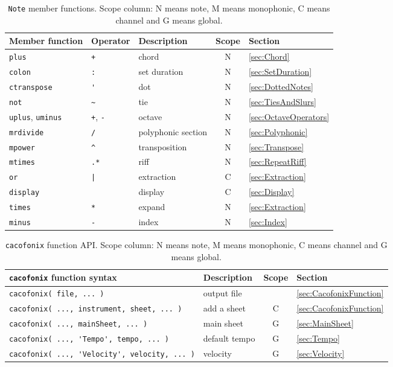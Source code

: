 \documentclass{article}
\begin{document}
\begin{table}[p]
	\centering
	\begin{tabular}{lllcl}
		Member function & Operator & Description & Scope & Section \\
		\hline
		\lstinline!plus! & \lstinline!+! & chord & N & \ref{sec:Chord} \\
		\lstinline!colon! & \lstinline!:! & set duration & N & \ref{sec:SetDuration} \\
		\lstinline!ctranspose! & \lstinline!'! & dot & N & \ref{sec:DottedNotes} \\
		\lstinline!not! & \lstinline!~! & tie & N & \ref{sec:TiesAndSlurs} \\
		\lstinline!uplus!, \lstinline!uminus! & \lstinline!+!, \lstinline!-! & octave & N & \ref{sec:OctaveOperators} \\
		\lstinline!mrdivide! & \lstinline!/! & polyphonic section & N & \ref{sec:Polyphonic} \\
		\lstinline!mpower! & \lstinline!^! & transposition & N & \ref{sec:Transpose} \\
		\lstinline!mtimes! & \lstinline!.*! & riff & N & \ref{sec:RepeatRiff} \\
		\lstinline!or! & \lstinline!|! & extraction & C & \ref{sec:Extraction} \\
		\lstinline!display!& & display & C & \ref{sec:Display} \\
		\lstinline!times! & \lstinline!*! & expand & N & \ref{sec:Extraction} \\
		\lstinline!minus! & \lstinline!-! & index & N & \ref{sec:Index} \\
	\end{tabular}
	\caption[\lstinline!Note! member functions]{\lstinline!Note! member functions. Scope column: N means note, M means monophonic, C means channel and G means global.}
	\label{tab:NoteFunctions}
\end{table}

\begin{table}[p]
	\centering
	\begin{tabular}{llcl}
		\lstinline!cacofonix! function syntax & Description & Scope & Section \\
		\hline
		\lstinline!cacofonix( file, ... )! & output file & & \ref{sec:CacofonixFunction} \\
		\lstinline!cacofonix( ..., instrument, sheet, ... )! & add a sheet & C & \ref{sec:CacofonixFunction} \\
		\lstinline!cacofonix( ..., mainSheet, ... )! & main sheet & G & \ref{sec:MainSheet} \\
		\lstinline!cacofonix( ..., 'Tempo', tempo, ... )! & default tempo & G & \ref{sec:Tempo} \\
		\lstinline!cacofonix( ..., 'Velocity', velocity, ... )! & velocity & G & \ref{sec:Velocity} \\
	\end{tabular}
	\caption[\lstinline!cacofonix! function API]{\lstinline!cacofonix! function API. Scope column: N means note, M means monophonic, C means channel and G means global.}
	\label{tab:CacofonixAPI}
\end{table}
\end{document}
